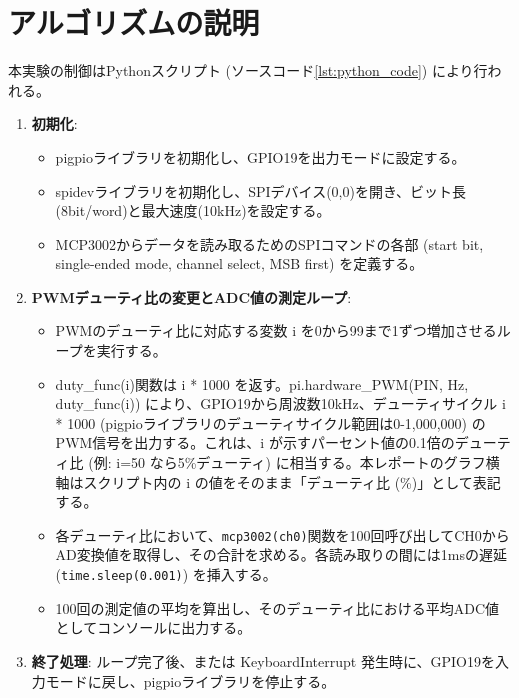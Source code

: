 \documentclass[a4paper,11pt,dvipdfmx]{jsarticle}
\begin{document}
\section{アルゴリズムの説明}
本実験の制御はPythonスクリプト (ソースコード\ref{lst:python_code}) により行われる。
\begin{enumerate}
    \item \textbf{初期化}:
    \begin{itemize}
        \item pigpioライブラリを初期化し、GPIO19を出力モードに設定する。
        \item spidevライブラリを初期化し、SPIデバイス(0,0)を開き、ビット長(8bit/word)と最大速度(10kHz)を設定する。
        \item MCP3002からデータを読み取るためのSPIコマンドの各部 (start bit, single-ended mode, channel select, MSB first) を定義する。
    \end{itemize}
    \item \textbf{PWMデューティ比の変更とADC値の測定ループ}:
    \begin{itemize}
        \item PWMのデューティ比に対応する変数 i を0から99まで1ずつ増加させるループを実行する。
        \item duty\_func(i)関数は i * 1000 を返す。pi.hardware\_PWM(PIN, Hz, duty\_func(i)) により、GPIO19から周波数10kHz、デューティサイクル i * 1000 (pigpioライブラリのデューティサイクル範囲は0-1,000,000) のPWM信号を出力する。これは、i が示すパーセント値の0.1倍のデューティ比 (例: i=50 なら5\%デューティ) に相当する。本レポートのグラフ横軸はスクリプト内の i の値をそのまま「デューティ比 (\%)」として表記する。
        \item 各デューティ比において、\texttt{mcp3002(ch0)}関数を100回呼び出してCH0からAD変換値を取得し、その合計を求める。各読み取りの間には1msの遅延 (\texttt{time.sleep(0.001)}) を挿入する。
        \item 100回の測定値の平均を算出し、そのデューティ比における平均ADC値としてコンソールに出力する。
    \end{itemize}
    \item \textbf{終了処理}: ループ完了後、または KeyboardInterrupt 発生時に、GPIO19を入力モードに戻し、pigpioライブラリを停止する。
\end{enumerate}
\end{document}
